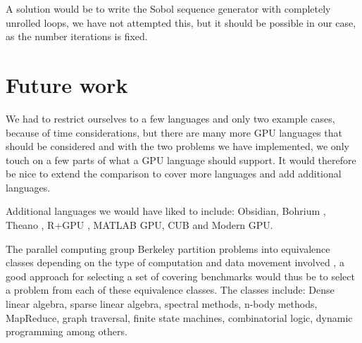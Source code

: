 \documentclass[preprint]{sigplanconf}
\begin{document}
A solution would be to write the Sobol sequence generator with
completely unrolled loops, we have not attempted this, but it should
be possible in our case, as the number iterations is fixed.



\section{Future work}
We had to restrict ourselves to a few languages and only two example
cases, because of time considerations, but there are many more GPU
languages that should be considered and with the two problems we have
implemented, we only touch on a few parts of what a GPU language
should support. It would therefore be nice to extend the comparison to
cover more languages and add additional languages.

Additional languages we would have liked to include: Obsidian, Bohrium
\cite{homepage:bohrium}, Theano \cite{bergstra2010theano}, R+GPU
\cite{homepage:rgpu}, MATLAB GPU, CUB and Modern GPU.

The parallel computing group Berkeley partition problems into
equivalence classes depending on the type of computation and data
movement involved \cite{homepage:dwarfmine}, a good approach for
selecting a set of covering benchmarks would thus be to select a
problem from each of these equivalence classes. The classes include:
Dense linear algebra, sparse linear algebra, spectral methods, n-body
methods, MapReduce, graph traversal, finite state machines,
combinatorial logic, dynamic programming among others.

\end{document}
